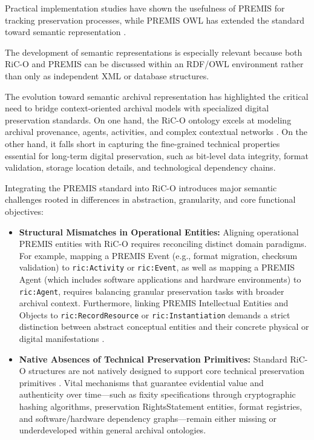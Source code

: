 \documentclass[runningheads]{llncs}
\begin{document}
	Practical implementation studies have shown the usefulness of PREMIS for tracking preservation processes, while PREMIS OWL has extended the standard toward semantic representation \cite{coppens2015premis}.
	
	The development of semantic representations is especially relevant because both RiC-O and PREMIS can be discussed within an RDF/OWL environment rather than only as independent XML or database structures.
	
	The evolution toward semantic archival representation has highlighted the critical need to bridge context-oriented archival models with specialized digital preservation standards. On one hand, the RiC-O ontology excels at modeling archival provenance, agents, activities, and complex contextual networks \cite{gueguen2013toward, dancy2024waiting}. On the other hand, it falls short in capturing the fine-grained technical properties essential for long-term digital preservation, such as bit-level data integrity, format validation, storage location details, and technological dependency chains.
	
	Integrating the PREMIS standard \cite{premis_data_dictionary_2015} into RiC-O introduces major semantic challenges rooted in differences in abstraction, granularity, and core functional objectives:
	
	\begin{itemize}
		
		\item \textbf{Structural Mismatches in Operational Entities:} Aligning operational PREMIS entities with RiC-O requires reconciling distinct domain paradigms. For example, mapping a PREMIS Event (e.g., format migration, checksum validation) to \texttt{ric:Activity} or \texttt{ric:Event}, as well as mapping a PREMIS Agent (which includes software applications and hardware environments) to \texttt{ric:Agent}, requires balancing granular preservation tasks with broader archival context. Furthermore, linking PREMIS Intellectual Entities and Objects to \texttt{ric:RecordResource} or \texttt{ric:Instantiation} demands a strict distinction between abstract conceptual entities and their concrete physical or digital manifestations \cite{premis_data_dictionary_2015, di2016premis}.
		
		\item \textbf{Native Absences of Technical Preservation Primitives:} Standard RiC-O structures are not natively designed to support core technical preservation primitives \cite{corrado2017digital}. Vital mechanisms that guarantee evidential value and authenticity over time—such as fixity specifications through cryptographic hashing algorithms, preservation RightsStatement entities, format registries, and software/hardware dependency graphs—remain either missing or underdeveloped within general archival ontologies.
		
	\end{itemize}
	
\end{document}
